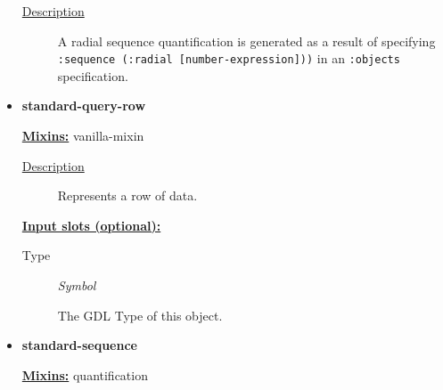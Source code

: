 \documentclass [11pt]{book}
\begin{document}
\begin{itemize}
\begin{description}

\item [
\underline{Description}]


A radial sequence quantification is generated as a result of specifying 
\texttt{:sequence (:radial [number-expression]))} in an \texttt{:objects} specification.



\end{description}









\item {}
\label{prim:standard-query-row}
\textbf{standard-query-row}


\textbf{
\underline{Mixins:}} vanilla-mixin





\begin{description}

\item [
\underline{Description}]


Represents a row of data.



\end{description}








\textbf{
\underline{Input slots (optional):}}

\begin{description}

\item [Type]
\emph{Symbol}

 The GDL Type of this object.




\end{description}







\item {}
\label{prim:standard-sequence}
\textbf{standard-sequence}


\textbf{
\underline{Mixins:}} quantification






\end{itemize}
\end{document}

